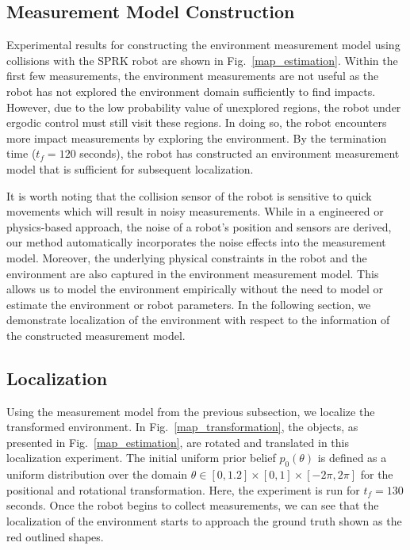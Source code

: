 \documentclass[conference]{IEEEtran}
\begin{document}
\subsection{Measurement Model Construction}
\label{sec:shape_est_exp}

Experimental results for constructing the environment measurement model using collisions with the SPRK robot are shown in Fig.~\ref{map_estimation}.
Within the first few measurements, the environment measurements are not useful as the robot has not explored the environment domain sufficiently to find impacts. 
However, due to the low probability value of unexplored regions, the robot under ergodic control must still visit these regions.
In doing so, the robot encounters more impact measurements by exploring the environment.
By the termination time ($t_f=120$ seconds), the robot has constructed an environment measurement model that is sufficient for subsequent localization.

It is worth noting that the collision sensor of the robot is sensitive to quick movements which will result in noisy measurements.
While in a engineered or physics-based approach, the noise of a robot's position and sensors are derived, our method automatically incorporates the noise effects into the measurement model.
Moreover, the underlying physical constraints in the robot and the environment are also captured in the environment measurement model.
This allows us to model the environment empirically without the need to model or estimate the environment or robot parameters.
In the following section, we demonstrate localization of the environment with respect to the information of the constructed measurement model. 

\subsection{Localization}

Using the measurement model from the previous subsection, we localize the transformed environment.
In Fig.~\ref{map_transformation}, the objects, as presented in Fig.~\ref{map_estimation}, are rotated and translated in this localization experiment. 
The initial uniform prior belief $p_0(\theta)$ is defined as a uniform distribution over the domain $\theta \in [0,1.2] \times [0, 1] \times [-2 \pi, 2 \pi]$ for the positional and rotational transformation.
Here, the experiment is run for $t_f=130$ seconds.
Once the robot begins to collect measurements, we can see that the localization of the environment starts to approach the ground truth shown as the red outlined shapes.
\end{document}
